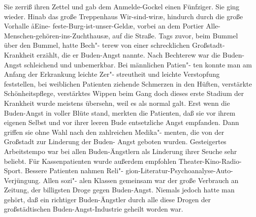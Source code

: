 Sie zerriß ihren Zettel und gab dem Anmelde-Gockel einen
Fünfziger. Sie ging wieder. Hinab das große Treppenhaus
\aanah{}Wir-sind-wir\ae{}, hindurch durch die große Vorhalle \aa{}Eine-%
feste-Burg-ist-unser-Geld\ae{}, vorbei an dem Portier \aanah{}Alle-%
Menschen-gehören-ins-Zuchthaus\ae{}, auf die Straße.
\abstand{}
Tags zuvor, beim Bummel über den Bummel, hatte Bech"-%
terew von einer schrecklichen Großstadt-Krankheit erzählt, die
er Buden-Angst nannte. Nach Bechterew war die Buden-%
Angst schleichend und unbemerkbar. Bei männlichen Patien"-%
ten konnte man am Anfang der Erkrankung leichte Zer"-%
streutheit und leichte Verstopfung feststellen, bei weiblichen
Patienten ziehende Schmerzen in den Hüften, verstärkte
Schönheitspflege, verstärktes Wippen beim Gang\dopp{} doch dieses
erste Stadium der Krankheit wurde meistens übersehn, weil
es als normal galt. Erst wenn die Buden-Angst in voller
Blüte stand, merkten die Patienten, daß sie vor ihrem eigenen
Selbst und vor ihrer leeren Bude entsetzliche Angst empfanden.
Dann griffen sie ohne Wahl nach den zahlreichen Medika"-%
menten, die von der Großstadt zur Linderung der Buden-%
Angst geboten wurden. Gesteigertes Arbeitstempo war bei
allen Buden-Ängstlern als Linderung ihrer Seuche sehr
beliebt. Für Kassenpatienten wurde außerdem empfohlen
Theater-Kino-Radio-Sport. Bessere Patienten nahmen Reli"-%
gion-Literatur-Psychoanalyse-Auto-Verjüngung. Allen sozi"-%
alen Klassen gemeinsam war der große Verbrauch an Zeitung,
der billigsten Droge gegen Buden-Angst. Niemals jedoch hatte
man gehört, daß ein richtiger Buden-Ängstler durch alle diese
Drogen der großstädtischen Buden-Angst-Industrie geheilt
worden war.
